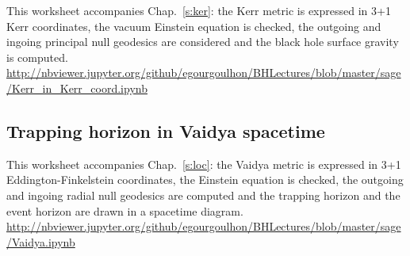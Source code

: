 This worksheet accompanies Chap.~\ref{s:ker}: the Kerr metric is expressed in 3+1 Kerr coordinates, the vacuum Einstein equation is checked, the outgoing and ingoing principal null geodesics are considered and the black hole surface gravity is computed.\\[1ex]
{\footnotesize
\url{http://nbviewer.jupyter.org/github/egourgoulhon/BHLectures/blob/master/sage/Kerr_in_Kerr_coord.ipynb}
}

\subsection{Trapping horizon in Vaidya spacetime} \label{s:sam:Vaidya_trapping}

This worksheet accompanies Chap.~\ref{s:loc}: the Vaidya metric is expressed in 3+1 Eddington-Finkelstein coordinates, the Einstein equation is checked, the outgoing and ingoing radial null geodesics are computed and the trapping horizon and the event
horizon are drawn in a spacetime diagram. \\[1ex]
{\footnotesize
\url{http://nbviewer.jupyter.org/github/egourgoulhon/BHLectures/blob/master/sage/Vaidya.ipynb}
}

